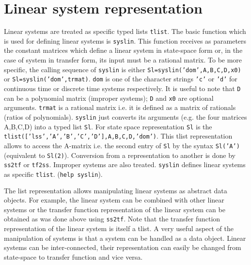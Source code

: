 
\appendix

\chapter{Linear system representation}
Linear systems are treated as specific typed lists {\tt tlist}.
The basic function which is used for defining linear systems is {\tt syslin}.
This function receives as parameters the constant matrices which
define a linear system in state-space form or, in the case of
system in transfer form, its input must be a rational matrix.
To be more specific, the calling sequence of {\tt syslin} is
either {\tt Sl=syslin('dom',A,B,C,D,x0)} or {\tt Sl=syslin('dom',trmat)}.
{\tt dom} is one of the character strings {\tt 'c'} or {\tt 'd'}
for continuous time or discrete time systems respectively.
It is useful to note that {\tt D} can be a polynomial matrix 
(improper systems); {\tt D} and {\tt x0} are optional arguments.
{\tt trmat} is a rational matrix i.e. it is defined as a matrix
of rationals (ratios of polynomials). {\tt syslin} just converts
its arguments (e.g. the four matrices A,B,C,D) into a typed
list {\tt Sl}. For state space representation {\tt Sl} is 
the {\tt tlist(['lss','A','B','C','D'],A,B,C,D,'dom')}. This tlist
representation allows to access the A-matrix i.e. the second entry of
{\tt Sl} by the syntax {\tt Sl('A')} (equivalent to {\tt Sl(2)}).
Conversion from a representation to another is done by {\tt ss2tf}
or {\tt tf2ss}. Improper systems are also treated. {\tt syslin} 
defines linear systems as specific {\tt tlist}. ({\tt help syslin}).



	The list representation allows manipulating linear systems as
abstract data objects.  For example, the linear system can be combined
with other linear systems or the transfer function representation of
the linear system can be obtained as was done above using {\tt ss2tf}.
Note that the transfer function representation of the linear system
is itself a tlist. 
	A very useful aspect of the manipulation of systems 
is that a system can be handled as a data object.
Linear systems can be 
inter-connected,
their representation
can easily be changed from state-space to transfer function
and vice versa.

